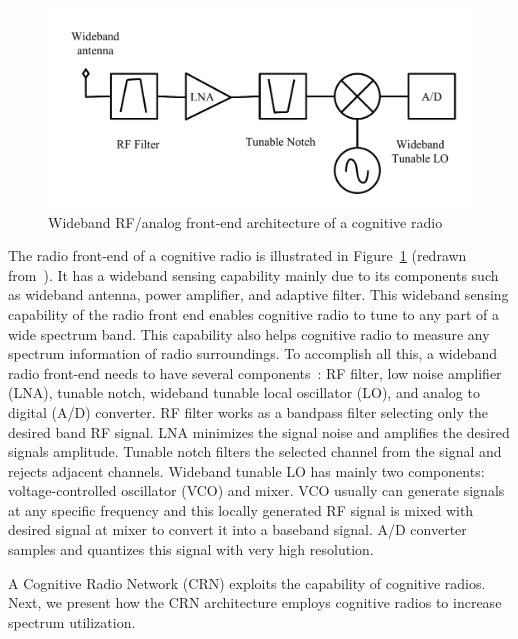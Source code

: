 \begin{figure}[!htbp]
\begin{center}
    \includegraphics[scale=0.5]{myFigures/RFFrontEnd}
    \caption{Wideband RF/analog front-end architecture of a cognitive radio}
    \label{fig:RFFrontEnd}
\end{center}
\end{figure}

The radio front-end of a cognitive radio is illustrated in Figure~\ref{fig:RFFrontEnd} (redrawn from~\cite{cabric2004implementation}). It has a wideband sensing capability mainly due to its components such as wideband antenna, power amplifier, and adaptive filter. This wideband sensing capability of the radio front end enables cognitive radio to tune to any part of a wide spectrum band. This capability also helps cognitive radio to measure any spectrum information of radio surroundings. To accomplish all this, a wideband radio front-end needs to have several components~\cite{akyildiz2006next}: RF filter, low noise amplifier (LNA), tunable notch, wideband tunable local oscillator (LO), and analog to digital (A/D) converter. RF filter works as a bandpass filter selecting only the desired band RF signal. LNA minimizes the signal noise and amplifies the desired signals amplitude. Tunable notch filters the selected channel from the signal and rejects adjacent channels. Wideband tunable LO has mainly two components: voltage-controlled oscillator (VCO) and mixer. VCO usually can generate signals at any specific frequency and this locally generated RF signal is mixed with desired signal at mixer to convert it into a baseband signal. A/D converter samples and quantizes this signal with very high resolution.


A Cognitive Radio Network (CRN) exploits the capability of cognitive radios. Next, we present how the CRN architecture employs cognitive radios to increase spectrum utilization.

